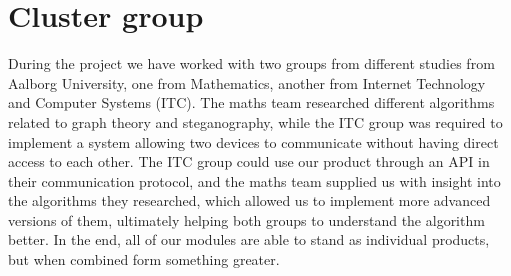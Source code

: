 \section*{Cluster group}
During the project we have worked with two groups from different studies from Aalborg University, one from Mathematics, another from Internet Technology and Computer Systems (ITC). 
The maths team researched different algorithms related to graph theory and steganography, while the ITC group was required to implement a system allowing two devices to communicate without having direct access to each other.
The ITC group could use our product through an API in their communication protocol, and the maths team supplied us with insight into the algorithms they researched, which allowed us to implement more advanced versions of them, ultimately helping both groups to understand the algorithm better.
In the end, all of our modules are able to stand as individual products, but when combined form something greater.
